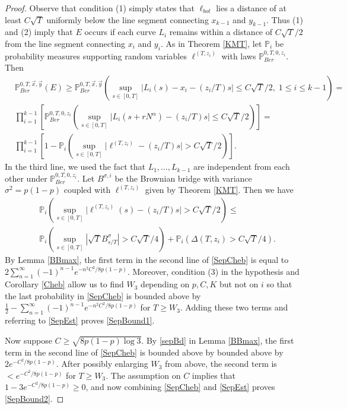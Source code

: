 \begin{proof}
	Observe that condition (1) simply states that $\ell_{bot}$ lies a distance of at least $C\sqrt{T}$ uniformly below the line segment connecting $x_{k-1}$ and $y_{k-1}$. Thus (1) and (2) imply that $E$ occurs if each curve $L_i$ remains within a distance of $C\sqrt{T}/2$ from the line segment connecting $x_i$ and $y_i$. As in Theorem \ref{KMT}, let $\mathbb{P}_i$ be probability measures supporting random variables $\ell^{(T,z_i)}$ with laws $\mathbb{P}^{0,T,0,z_i}_{Ber}$. Then
	\begin{equation}\label{SepEst}
	\begin{split}
	& \mathbb{P}^{0, T,\vec{x},\vec{y}}_{Ber} (E) \geq \mathbb{P}^{0,T,\vec{x},\vec{y}}_{Ber} \left(\sup_{s\in[0,T]} \big|L_i(s) - x_i - (z_i/T)s\big| \leq C\sqrt{T}/2, \;1\leq i\leq k-1\right) =\\
	&\prod_{i=1}^{k-1}\left[ \mathbb{P}^{0,T,0,z_i}_{Ber} \left(\sup_{s\in[0,T]} \big|L_i(s+rN^\alpha) - (z_i/T)s\big| \leq C\sqrt{T}/2\right)\right] =\\
	&\prod_{i=1}^{k-1}\left[ 1 - \mathbb{P}_i\left(\sup_{s\in[0,T]} \big|\ell^{(T,z_i)} - (z_i/T)s\big| > C\sqrt{T}/2\right)\right]. \end{split}
	\end{equation}
	In the third line, we used the fact that $L_1,\dots,L_{k-1}$ are independent from each other under $\mathbb{P}^{0,T,0,z_i}_{Ber}$. Let $B^{\sigma,i}$ be the Brownian bridge with variance $\sigma^2 = p(1-p)$ coupled with $\ell^{(T,z_i)}$ given by Theorem \ref{KMT}. Then we have
	\begin{equation}\label{SepCheb}
	\begin{split}
	&\mathbb{P}_i \left(\sup_{s\in[0,T]} \big|\ell^{(T,z_i)}(s) - (z_i/T)s\big| > C\sqrt{T}/2\right) \leq \\
	& \mathbb{P}_i\left(\sup_{s\in[0,T]} |\sqrt{T}B^{\sigma}_{s/T}| > C\sqrt{T}/4\right) + \mathbb{P}_i\left(\Delta(T,z_i) > C\sqrt{T}/4\right).
	\end{split}
	\end{equation}
	By Lemma \ref{BBmax}, the first term in the second line of \eqref{SepCheb} is equal to $2\sum_{n=1}^\infty (-1)^{n-1} e^{-n^2C^2/8p(1-p)}$. Moreover, condition (3) in the hypothesis and Corollary \ref{Cheb} allow us to find $W_3$ depending on $p,C,K$ but not on $i$ so that the last probability in \eqref{SepCheb} is bounded above by $\frac{1}{2} - \sum_{n=1}^\infty (-1)^{n-1} e^{-n^2C^2/8p(1-p)}$ for $T\geq W_3$. Adding these two terms and referring to \eqref{SepEst} proves \eqref{SepBound1}.
	
	Now suppose $C\geq\sqrt{8p(1-p)\log 3}$. By \eqref{sepBd} in Lemma \ref{BBmax}, the first term in the second line of \eqref{SepCheb} is bounded above by bounded above by $2e^{-C^2/8p(1-p)}$. After possibly enlarging $W_3$ from above, the second term is $<e^{-C^2/8p(1-p)}$ for $T\geq W_3$. The assumption on $C$ implies that $1-3e^{-C^2/8p(1-p)}\geq 0$, and now combining \eqref{SepCheb} and \eqref{SepEst} proves \eqref{SepBound2}.
\end{proof}


